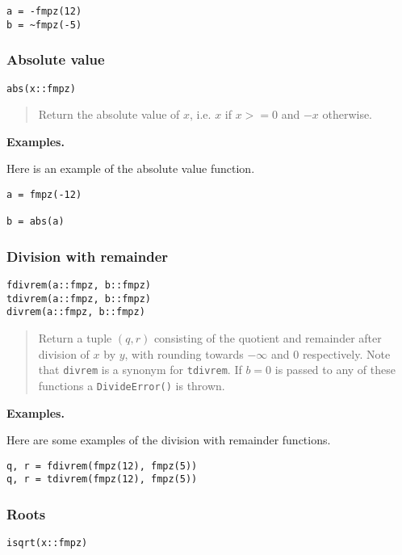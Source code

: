 \documentclass[a4paper,10pt]{article}
\newcommand{\code}{\lstinline}
\newcommand{\desc}[1]{\vspace{-3mm}\begin{quote}#1\end{quote}}
\begin{document}
{{\begin{lstlisting}
a = -fmpz(12)
b = ~fmpz(-5)
\end{lstlisting}

\subsubsection{Absolute value}

\begin{lstlisting}
abs(x::fmpz)
\end{lstlisting}

\desc{Return the absolute value of $x$, i.e. $x$ if $x >= 0$ and $-x$ otherwise.}

\textbf{Examples.}

Here is an example of the absolute value function.

\begin{lstlisting}
a = fmpz(-12)

b = abs(a)
\end{lstlisting}

\subsubsection{Division with remainder}

\begin{lstlisting}
fdivrem(a::fmpz, b::fmpz)
tdivrem(a::fmpz, b::fmpz)
divrem(a::fmpz, b::fmpz)
\end{lstlisting}

\desc{Return a tuple $(q, r)$ consisting of the quotient and remainder after 
division of $x$ by $y$, with rounding towards $-\infty$ and $0$ respectively. Note 
that \code{divrem} is a synonym for \code{tdivrem}. If $b = 0$ is passed to any
of these functions a \code{DivideError()} is thrown.}

\textbf{Examples.}

Here are some examples of the division with remainder functions.

\begin{lstlisting}
q, r = fdivrem(fmpz(12), fmpz(5))
q, r = tdivrem(fmpz(12), fmpz(5))
\end{lstlisting}

\subsubsection{Roots}

\begin{lstlisting}
isqrt(x::fmpz)
\end{lstlisting}

}}
\end{document}
